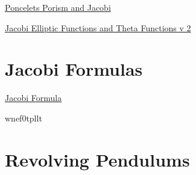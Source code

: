 \documentclass{ximera}
\begin{document}
\href{https://www.desmos.com/calculator/lwbypn9rje}{Poncelets Porism and Jacobi}


\begin{onlineOnly}
    \begin{center}
\end{center}
\end{onlineOnly}

\href{https://www.desmos.com/calculator/svb8pwijet}{Jacobi Elliptic Functions and Theta Functions v 2}



\section{Jacobi Formulas}

\begin{onlineOnly}
    \begin{center}
\end{center}
\end{onlineOnly}

\href{https://www.desmos.com/calculator/wnef0tpllt}{Jacobi Formula}

wnef0tpllt


\section*{Revolving Pendulums}
\end{document}
